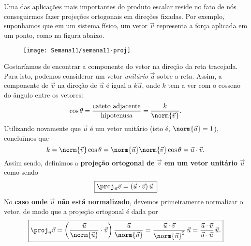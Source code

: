 Uma das aplicações mais importantes do produto escalar reside no fato de nós conseguirmos fazer projeções ortogonais em direções fixadas. Por exemplo, suponhamos que em um sistema físico, um vetor $\vec{v}$ representa a força aplicada em um ponto, como na figura abaixo.
\begin{figure}[h!]
	\begin{center}
		\texttt{[image: Semana11/semana11-proj]}
	\end{center}
\end{figure} Gostaríamos de encontrar a componente do vetor na direção da reta tracejada. Para isto, podemos considerar um vetor \textit{unitário} $\vec{u}$ sobre a reta. Assim, a componente de $\vec{v}$ na direção de $\vec{u}$ é igual a $k \vec{u}$, onde $k$ tem a ver com o cosseno do ângulo entre os vetores:
\begin{equation}
\cos \theta = \frac{\text{cateto adjacente}}{\text{hipotenusa}} = \frac{k}{\norm{\vec{v}}}.
\end{equation} Utilizando novamente que $\vec{u}$ é um vetor unitário (isto é, $\norm{\vec{u}}=1$), concluímos que
\begin{equation}
k = \norm{\vec{v}} \cos \theta = \norm{\vec{u}} \norm{\vec{v}} \cos \theta = \vec{u} \cdot \vec{v}.
\end{equation} Assim sendo, definimos a \textbf{projeção ortogonal de $\vec{v}$ em um vetor unitário $\vec{u}$} como sendo
\begin{equation}
\boxed{\proj_{\vec{u}} \vec{v} = (\vec{u} \cdot \vec{v}) \, \vec{u}.}
\end{equation} No \textbf{caso onde $\vec{u}$ não está normalizado}, devemos primeiramente normalizar o vetor, de modo que a projeção ortogonal é dada por
\begin{equation}
\boxed{\proj_{\vec{u}} \vec{v} = \bigg( \frac{\vec{u}}{\norm{\vec{u}}} \cdot \vec{v} \bigg) \, \frac{\vec{u}}{\norm{\vec{u}}} = \frac{\vec{u} \cdot \vec{v}}{\norm{\vec{u}}^2} \, \vec{u} = \frac{\vec{u} \cdot \vec{v}}{\vec{u} \cdot \vec{u}} \, \vec{u}.}
\end{equation}

